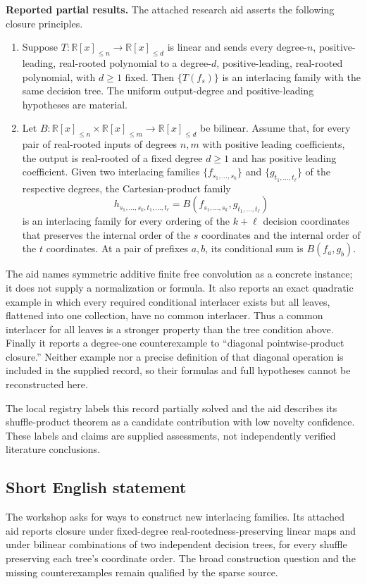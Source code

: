 \documentclass[11pt]{article}
\newcommand{\R}{\mathbb{R}}
\begin{document}
\textbf{Reported partial results.} The attached research aid asserts the following closure principles.
\begin{enumerate}
\item Suppose $T:\R[x]_{\leq n}\to\R[x]_{\leq d}$ is linear and sends every degree-$n$, positive-leading, real-rooted polynomial to a degree-$d$, positive-leading, real-rooted polynomial, with $d\geq1$ fixed. Then $\{T(f_s)\}$ is an interlacing family with the same decision tree. The uniform output-degree and positive-leading hypotheses are material.
\item Let $B:\R[x]_{\leq n}\times\R[x]_{\leq m}\to\R[x]_{\leq d}$ be bilinear. Assume that, for every pair of real-rooted inputs of degrees $n,m$ with positive leading coefficients, the output is real-rooted of a fixed degree $d\geq1$ and has positive leading coefficient. Given two interlacing families $\{f_{s_1,\ldots,s_k}\}$ and $\{g_{t_1,\ldots,t_\ell}\}$ of the respective degrees, the Cartesian-product family
\[
 h_{s_1,\ldots,s_k,t_1,\ldots,t_\ell}=B(f_{s_1,\ldots,s_k},g_{t_1,\ldots,t_\ell})
\]
is an interlacing family for every ordering of the $k+\ell$ decision coordinates that preserves the internal order of the $s$ coordinates and the internal order of the $t$ coordinates. At a pair of prefixes $a,b$, its conditional sum is $B(f_a,g_b)$.
\end{enumerate}
The aid names symmetric additive finite free convolution as a concrete instance; it does not supply a normalization or formula. It also reports an exact quadratic example in which every required conditional interlacer exists but all leaves, flattened into one collection, have no common interlacer. Thus a common interlacer for all leaves is a stronger property than the tree condition above. Finally it reports a degree-one counterexample to ``diagonal pointwise-product closure.'' Neither example nor a precise definition of that diagonal operation is included in the supplied record, so their formulas and full hypotheses cannot be reconstructed here.

The local registry labels this record partially solved and the aid describes its shuffle-product theorem as a candidate contribution with low novelty confidence. These labels and claims are supplied assessments, not independently verified literature conclusions.
\subsection{Short English statement}
The workshop asks for ways to construct new interlacing families. Its attached aid reports closure under fixed-degree real-rootedness-preserving linear maps and under bilinear combinations of two independent decision trees, for every shuffle preserving each tree's coordinate order. The broad construction question and the missing counterexamples remain qualified by the sparse source.
\end{document}
